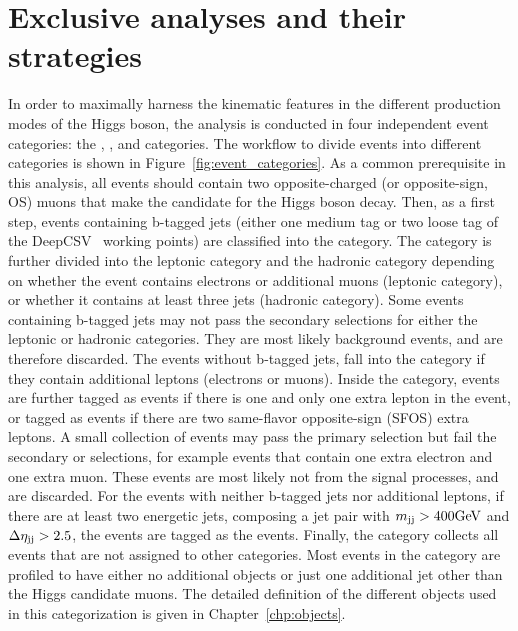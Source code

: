 \section{Exclusive analyses and their strategies}\label{sec:hmm_cat_and_strategy}
In order to maximally harness the kinematic features in the different production modes of the Higgs boson,
the analysis is conducted in four independent event categories: the \ggH, \qqH, \VH and \ttH categories.
The workflow to divide events into different categories is shown in Figure~\ref{fig:event_categories}.
As a common prerequisite in this analysis, all events should contain two opposite-charged (or opposite-sign, OS) muons that make the candidate for the Higgs boson decay. 
Then, as a first step, events containing b-tagged jets (either one medium tag or two loose tag of the DeepCSV~\cite{Sirunyan:2017ezt} working points) are classified into the \ttH category.
The \ttH category is further divided into the \ttH leptonic category and the \ttH hadronic category depending on whether the event contains electrons or additional muons (leptonic category), 
or whether it contains at least three jets (hadronic category).
Some events containing b-tagged jets may not pass the secondary selections for either the leptonic or hadronic \ttH categories.
They are most likely background events, and are therefore discarded.
The events without b-tagged jets, fall into the \VH category if they contain additional leptons (electrons or muons).
Inside the \VH category, events are further tagged as \WH events if there is one and only one extra lepton in the event, 
or tagged as \ZH events if there are two same-flavor opposite-sign (SFOS) extra leptons.
A small collection of events may pass the primary \VH selection but fail the secondary \WH or \ZH selections, 
for example events that contain one extra electron and one extra muon.
These events are most likely not from the signal processes, and are discarded.
For the events with neither b-tagged jets nor additional leptons, if there are at least two energetic jets, 
composing a jet pair with $m_{\mathrm{jj}}>400\mbox{GeV}$ and $\Delta\eta_{\mathrm{jj}}>2.5$, the events are tagged as the \qqH events.
Finally, the \ggH category collects all events that are not assigned to other categories. 
Most events in the \ggH category are profiled to have either no additional objects or just one additional jet other than the Higgs candidate muons.
The detailed definition of the different objects used in this categorization is given in Chapter~\ref{chp:objects}.


